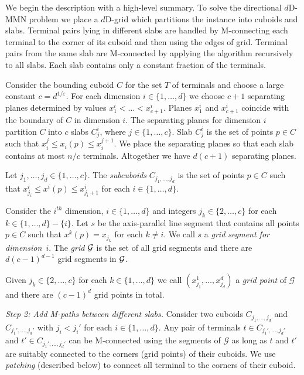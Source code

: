 \documentclass[11pt]{llncs}
\newcommand{\eps}{\ensuremath{\varepsilon}\xspace}
\begin{document}
We begin the description with a high-level summary.  To solve the
directional $d$D-MMN problem we place a $d$D-grid which partitions the
instance into 
cuboids and slabs.  Terminal pairs lying in different slabs are
handled by M-connecting each terminal to the corner of its cuboid and
then using the edges of grid. Terminal pairs from the same slab are
M-connected by applying the algorithm recursively to all slabs.  Each
slab contains only a constant fraction of the terminals.

\noindent
\smallskip
{} Consider
the bounding cuboid $C$ for the set $T$ of terminals and choose a
large constant $c=d^{1/\eps}$.  For each dimension $i\in\{1,\dots,d\}$
we choose $c+1$ separating planes determined by values
$x_1^i<\dots<x_{c+1}^i$.  Planes $x_1^i$ and $x_{c+1}^i$ coincide with
the boundary of $C$ in dimension $i$.  The separating planes for
dimension $i$ partition $C$ into $c$ slabs $C_j^i$, where
$j\in\{1,\dots,c\}$.  Slab $C_j^i$ is the set of points $p\in C$ such
that $x_i^j\leq x_i(p)\leq x_i^{j+1}$. We place the separating planes
so that each slab contains at most $n/c$ terminals.  Altogether we
have $d(c+1)$ separating planes.

Let $j_1,\dots,j_d\in\{1,\dots,c\}$.  The \emph{subcuboids}
$C_{j_1,\dots,j_d}$ is the set of points $p\in C$ such that
$x_{j_i}^i\leq x^i(p)\leq x_{j_i+1}^i$ for each $i\in \{1,\dots,d\}$.

Consider the $i^{th}$ dimension, $i\in\{1,\dots,d\}$ and integers
$j_k\in\{2,\dots,c\}$ for each $k\in\{1,\dots,d\}-\{i\}$.  Let $s$ be
the axis-parallel line segment that contains all points $p\in C$ such
that $x^k(p)=x_{j_k}$ for each $k\neq i$.  We call $s$ a \emph{grid
  segment for dimension~$i$}.  The \emph{grid $\cal G$} is the set of
all grid segments and there are $d(c-1)^{d-1}$ grid segments in $\cal
G$.

Given $j_k\in\{2,\dots,c\}$ for each $k\in\{1,\dots,d\}$ we call
$(x_{j_1}^1,\dots,x_{j_d}^d)$ a \emph{grid point} of $\mathcal G$ and 
there are $(c-1)^d$ grid points in total.


\smallskip
\noindent
{\em Step 2: Add M-paths between different slabs.} 
Consider two cuboids $C_{j_1,\dots,j_d}$ and $C_{j_1',\dots,j_d'}$
with $j_i<j_i'$ for each $i\in\{1,\dots,d\}$.  Any pair of terminals
$t\in C_{j_1',\dots,j_d'} $ and $t'\in C_{j_1',\dots,j_d'}$ can be
M-connected using the segments of $\mathcal G$ as long as $t$ and $t'$
are suitably connected to the corners (grid points) of their cuboids.
We use {\em patching} (described below) to connect all terminal to the
corners of their cuboid.
\end{document}
